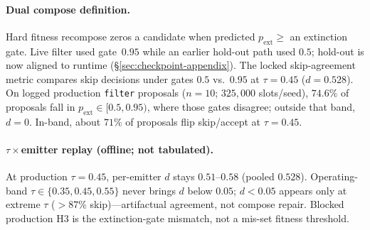 \begin{table}[!htbp]
  \centering
  \caption{H3-gray: gray-zone filter $-$ hints ($n{=}10$; not superior; Holm $m{=}3$). Eval uses exact one-sided Wilcoxon; NI rows use the protocol's one-sided non-inferiority tests (not Wilcoxon---those $p$-values can fall below $2^{-10}{=}9.77\times10^{-4}$). $\mathrm{PPS}$ (Eq.~\eqref{eq:pps}) kept here because NI rows are non-extreme; not independent-sample $A_{12}$.}
  \label{tab:h3-gray-holm}
  \small
\end{table}

\paragraph{Dual compose definition.}
Hard fitness recompose zeros a candidate when predicted $p_{\mathrm{ext}}\ge$ an extinction gate. Live filter used gate~$0.95$ while an earlier hold-out path used $0.5$; hold-out is now aligned to runtime (\S\ref{sec:checkpoint-appendix}). The locked skip-agreement metric compares skip decisions under gates $0.5$ vs.\ $0.95$ at $\tau{=}0.45$ ($d{=}0.528$). On logged production \texttt{filter} proposals ($n{=}10$; $325{,}000$ slots/seed), $74.6\%$ of proposals fall in $p_{\mathrm{ext}}\in[0.5,0.95)$, where those gates disagree; outside that band, $d{=}0$. In-band, about $71\%$ of proposals flip skip/accept at $\tau{=}0.45$.

\paragraph{$\tau\times$emitter replay (offline; not tabulated).}
At production $\tau{=}0.45$, per-emitter $d$ stays $0.51$--$0.58$ (pooled $0.528$). Operating-band $\tau\in\{0.35,0.45,0.55\}$ never brings $d$ below $0.05$; $d{<}0.05$ appears only at extreme $\tau$ (${>}87\%$ skip)---artifactual agreement, not compose repair. Blocked production H3 is the extinction-gate mismatch, not a mis-set fitness threshold.

